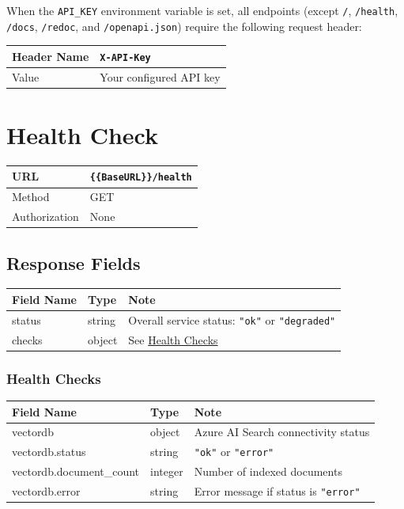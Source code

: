 \documentclass[11pt]{article}
\begin{document}
When the \texttt{API\_KEY} environment variable is set, all endpoints (except
\texttt{/}, \texttt{/health}, \texttt{/docs}, \texttt{/redoc}, and
\texttt{/openapi.json}) require the following request header:

\begin{tabular}{|H{4cm}|p{11.1cm}|}
  \hline
  Header Name & \texttt{X-API-Key} \\
  \hline
  Value       & Your configured API key \\
  \hline
\end{tabular}

\section{Health Check}

\begin{tabular}{|H{3cm}|p{12.1cm}|}
  \hline
  URL           & \texttt{\{\{BaseURL\}\}/health} \\
  \hline
  Method        & GET \\
  \hline
  Authorization & None \\
  \hline
\end{tabular}

\subsection{Response Fields}

\begin{longtable}{|p{3.5cm}|p{2cm}|p{9.2cm}|}
  \hline
  \rowcolor{tabheader}
  \textbf{Field Name} & \textbf{Type} & \textbf{Note} \\
  \hline
  \endhead
  status  & string & Overall service status: \texttt{"ok"} or \texttt{"degraded"} \\
  \hline
  checks  & object & See \hyperref[sec:healthchecks]{Health Checks} \\
  \hline
\end{longtable}

\subsubsection{Health Checks}
\label{sec:healthchecks}

\begin{longtable}{|p{4.5cm}|p{2cm}|p{8.2cm}|}
  \hline
  \rowcolor{tabheader}
  \textbf{Field Name} & \textbf{Type} & \textbf{Note} \\
  \hline
  \endhead
  vectordb                 & object  & Azure AI Search connectivity status \\
  \hline
  vectordb.status          & string  & \texttt{"ok"} or \texttt{"error"} \\
  \hline
  vectordb.document\_count & integer & Number of indexed documents \\
  \hline
  vectordb.error           & string  & Error message if status is \texttt{"error"} \\
  \hline
\end{longtable}
\end{document}

